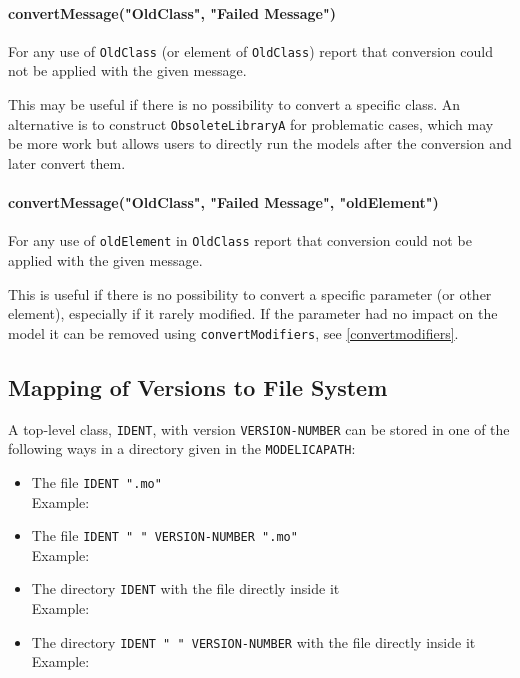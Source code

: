\paragraph*{convertMessage("OldClass", "Failed Message")}\label{convertmessageoldclass-failed-message}

For any use of \lstinline!OldClass! (or element of \lstinline!OldClass!) report that conversion
could not be applied with the given message.

\begin{nonnormative}
This may be useful if there is no possibility to convert a specific class. An alternative is to construct \lstinline!ObsoleteLibraryA! for problematic
cases, which may be more work but allows users to directly run the models after the conversion and later convert them.
\end{nonnormative}

\paragraph*{convertMessage("OldClass", "Failed Message", "oldElement")}\label{convertmessageoldclass-failed-message2}

For any use of \lstinline!oldElement! in \lstinline!OldClass! report that conversion
could not be applied with the given message.

\begin{nonnormative}
This is useful if there is no possibility to convert a specific parameter (or other element), especially if it rarely modified.  If the parameter had no impact on the model it can be removed using \lstinline!convertModifiers!, see \cref{convertmodifiers}.
\end{nonnormative}

\subsection{Mapping of Versions to File System}\label{mapping-of-versions-to-file-system}

A top-level class, \lstinline!IDENT!, with version \lstinline!VERSION-NUMBER! can be stored in
one of the following ways in a directory given in the \lstinline!MODELICAPATH!:
\begin{itemize}
\item
  The file \lstinline!IDENT ".mo"!\\
  Example: 
\item
  The file \lstinline!IDENT " " VERSION-NUMBER ".mo"!\\
  Example: 
\item
  The directory \lstinline!IDENT! with the file  directly inside it\\
  Example: 
\item
  The directory \lstinline!IDENT " " VERSION-NUMBER! with the file  directly inside it\\
  Example: 
\end{itemize}

